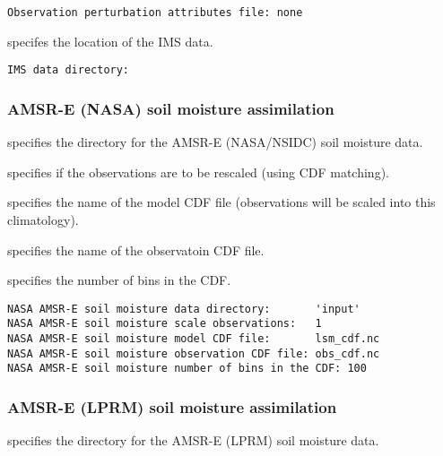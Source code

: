 \begin{Verbatim}[frame=single]
Observation perturbation attributes file: none
 \end{Verbatim}

 
  specifes the location of the IMS data.
 

 \begin{Verbatim}[frame=single]
IMS data directory:
 \end{Verbatim}







 
 \subsubsection{AMSR-E (NASA) soil moisture assimilation}
 \label{sssec:nasaamsreda}
 

 
  specifies the directory
 for the AMSR-E (NASA/NSIDC) soil moisture data.

  specifies if the
 observations are to be rescaled (using CDF matching).

  specifies the
 name of the model CDF file (observations will be scaled into this
 climatology).

  specifies the
 name of the observatoin CDF file.

  specifies the
 number of bins in the CDF.
 

 \begin{Verbatim}[frame=single]
NASA AMSR-E soil moisture data directory:       'input'
NASA AMSR-E soil moisture scale observations:   1
NASA AMSR-E soil moisture model CDF file:       lsm_cdf.nc
NASA AMSR-E soil moisture observation CDF file: obs_cdf.nc
NASA AMSR-E soil moisture number of bins in the CDF: 100 
 \end{Verbatim}

 
 \subsubsection{AMSR-E (LPRM) soil moisture assimilation}
 \label{sssec:lprmamsreda}
 

 
  specifies the
 directory for the AMSR-E (LPRM) soil moisture data.

